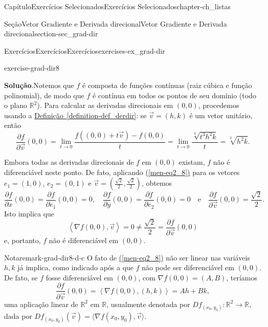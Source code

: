 \documentclass[oneside,10pt,]{book}
\newcommand{\blocktitlefont}{\relax}
\newcommand{\xreffont}{\relax}
\numberwithin{equation}{section}
\newcommand{\R}{\mathbb R}
\begin{document}
\begin{chapterptx}{Capítulo}{Exercícios Selecionados}{}{Exercícios Selecionados}{}{}{chapter-ch_listas}
\begin{sectionptx}{Seção}{Vetor Gradiente e Derivada direcional}{}{Vetor Gradiente e Derivada direcional}{}{}{section-sec_grad-dir}
\begin{exercises-subsection-numberless}{Exercícios}{Exercícios}{}{Exercícios}{}{}{exercises-ex_grad-dir}
\begin{divisionexercise}{8}{}{}{exercise-grad-dir8}
\par\smallskip%
\noindent\textbf{\blocktitlefont Solução}.\hypertarget{solution-grad-dir8-d}{}\quad{}Notemos que \(f\) é composta de funções contínuas (raiz cúbica e função polinomial), de modo que \(f\) é contínua em todos os pontos de seu domínio (todo o plano \(\R^2\)). Para calcular as derivadas direcionais em \((0,0)\), procedemos usando a \hyperref[definition-def_derdir]{Definição~{\xreffont\ref{definition-def_derdir}}}: se \(\vec{v}= (h,k)\) é um vetor unitário, então%
\begin{equation}
\dfrac{\partial f}{\partial \vec{v}}(0,0)= \lim_{t \to 0}
\frac{f((0,0)+t\vec{v}) - f(0,0)}{t} = \lim_{t \to 0}
\frac{\sqrt[3]{t^3h^2k}}{t} = \sqrt[3]{h^2k}.\label{men-eq2_8}
\end{equation}
%
\par
Embora todas as derivadas direcionais de \(f\) em \((0,0)\) existam, \(f\) não é diferenciável neste ponto. De fato, aplicando \hyperref[men-eq2_8]{({\xreffont\ref{men-eq2_8}})} para os vetores \(e_1=(1,0)\), \(e_2=(0,1)\) e \(\vec{v} = \left(
\frac{\sqrt{2}}{2}, \frac{\sqrt{2}}{2}\right)\), obtemos%
\begin{equation*}
\dfrac{\partial f}{\partial x}(0,0) = \frac{\partial
f}{\partial e_1}(0,0) = 0, \quad \frac{\partial f}{\partial
y}(0,0) = \frac{\partial f}{\partial e_2}(0,0) = 0 \quad
\text{e} \quad \frac{\partial f}{\partial \vec{v}}(0,0) =
\frac{\sqrt{2}}{2}.
\end{equation*}
Isto implica que%
\begin{equation*}
\left\langle
\nabla f(0,0), \vec{v}\right \rangle = 0 \neq \frac{\sqrt{2}}{2}
=\frac{\partial f}{\partial \vec{v}}(0,0)
\end{equation*}
e, portanto, \(f\) não é diferenciável em \((0,0)\).%
\begin{remark}{Nota}{}{remark-grad-dir8-d-c}%
O fato de \hyperref[men-eq2_8]{({\xreffont\ref{men-eq2_8}})} não ser linear nas variáveis \(h,k\) já implica, como indicado após a  que \(f\) não pode ser diferenciável em \((0,0)\). De fato, se \(f\) fosse diferenciável em \((0,0)\), com \(\nabla f(0,0)=(A,B)\), teríamos%
\begin{equation*}
\dfrac{\partial f}{\partial \vec{v}}(0,0) = \left\langle
\nabla f(0,0), (h,k)\right\rangle = Ah + Bk,
\end{equation*}
uma aplicação linear de \(\R^2\) em \(\R\), usualmente denotada por \(Df_{(x_0,y_0)}\colon\R^2\to\R\), dada por \(Df_{(x_0,y_0)}(\vec{v})=\langle\nabla
f(x_0,y_0),\vec{v}\rangle\).\end{remark}

\end{divisionexercise}
\end{exercises-subsection-numberless}
\end{sectionptx}
\end{chapterptx}
\end{document}
